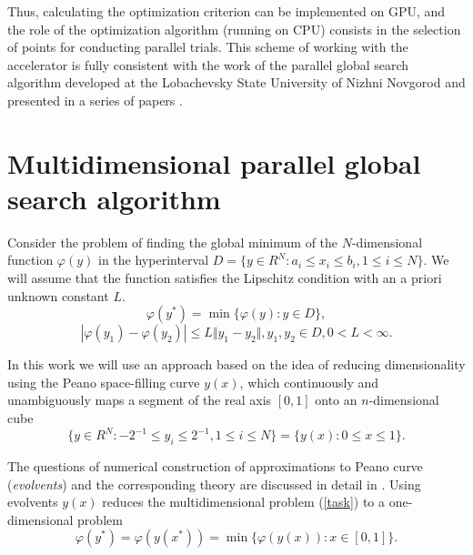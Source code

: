 \documentclass{svproc}
\begin{document}
Thus, calculating the optimization criterion can be implemented on GPU, and the role of the optimization algorithm (running on CPU) consists in the selection of points for conducting parallel trials. This scheme of working with the accelerator is fully consistent with the work of the parallel global search algorithm developed at the Lobachevsky State University of Nizhni Novgorod and presented in a series of papers \cite{Barkalov2014,Barkalov2020,Barkalov2019,Grishagin2016,Grishagin2015,Grishagin2018,globalizerSystem}.


\section{Multidimensional parallel global search algorithm}\label{Sec_GSA}
Consider the problem of finding the global minimum of the \(N\)-dimensional function \(\varphi(y)\) in the hyperinterval  \(D=\{y\in R^N:a_i\leqslant x_i\leqslant{b_i}, 1\leqslant{i}\leqslant{N}\}\).  We will assume that the function satisfies the Lipschitz condition with an a priori unknown constant \(L\).
\begin{equation}
\label{task}
\varphi(y^*)=\min\{\varphi(y):y\in D\},
\end{equation}
\begin{equation}
\label{lip}
|\varphi(y_1)-\varphi(y_2)|\leqslant L\Vert y_1-y_2\Vert,y_1,y_2\in D,0<L<\infty.
\end{equation}

In this work we will use an approach based on the idea of reducing dimensionality using the Peano space-filling curve \(y(x)\), which continuously and unambiguously maps a segment of the real axis \([0,1]\) onto an \(n\)-dimensional cube
\begin{equation}
\label{cube}
\lbrace y\in R^N:-2^{-1}\leqslant y_i\leqslant 2^{-1},1\leqslant i\leqslant N\rbrace=\{y(x):0\leqslant x\leqslant 1\}.
\end{equation}

The questions of numerical construction of approximations to Peano curve (\textit{evolvents}) and the corresponding theory are discussed in detail in \cite{Sergeyev2013,Strongin2000}. Using evolvents \(y(x)\) reduces the multidimensional problem (\ref{task}) to a one-dimensional problem
\begin{displaymath}
\label{oneDimTask}
\varphi(y^*)=\varphi(y(x^*))=\min\{\varphi(y(x)):x\in [0,1]\}.
\end{displaymath}
\end{document}
